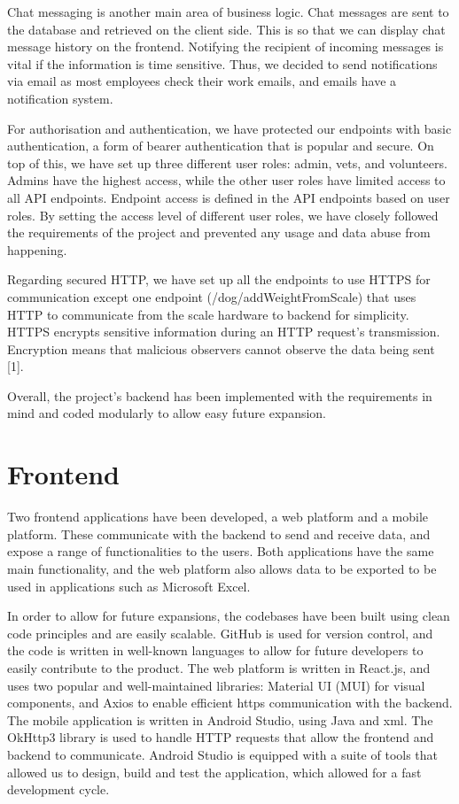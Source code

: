 Chat messaging is another main area of business logic. Chat messages are sent to the database and retrieved on the client side. This is so that we can display chat message history on the frontend. Notifying the recipient of incoming messages is vital if the information is time sensitive. Thus, we decided to send notifications via email as most employees check their work emails, and emails have a notification system.

For authorisation and authentication, we have protected our endpoints with basic authentication, a form of bearer authentication that is popular and secure. On top of this, we have set up three different user roles: admin, vets, and volunteers. Admins have the highest access, while the other user roles have limited access to all API endpoints. Endpoint access is defined in the API endpoints based on user roles. By setting the access level of different user roles, we have closely followed the requirements of the project and prevented any usage and data abuse from happening.

Regarding secured HTTP, we have set up all the endpoints to use HTTPS for communication except one endpoint (/dog/addWeightFromScale) that uses HTTP to communicate from the scale hardware to backend for simplicity. HTTPS encrypts sensitive information during an HTTP request’s transmission. Encryption means that malicious observers cannot observe the data being sent [1].

Overall, the project's backend has been implemented with the requirements in mind and coded modularly to allow easy future expansion.


\section{Frontend}
Two frontend applications have been developed, a web platform and a mobile platform. These communicate with the backend to send and receive data, and expose a range of functionalities to the users. Both applications have the same main functionality, and the web platform also allows data to be exported to be used in applications such as Microsoft Excel. 

In order to allow for future expansions, the codebases have been built using clean code principles and are easily scalable. GitHub is used for version control, and the code is written in well-known languages to allow for future developers to easily contribute to the product. The web platform is written in React.js, and uses two popular and well-maintained libraries: Material UI (MUI) for visual components, and Axios to enable efficient https communication with the backend. The mobile application is written in Android Studio, using Java and xml. The OkHttp3 library is used to handle HTTP requests that allow the frontend and backend to communicate. Android Studio is equipped with a suite of tools that allowed us to design, build and test the application, which allowed for a fast development cycle. 

